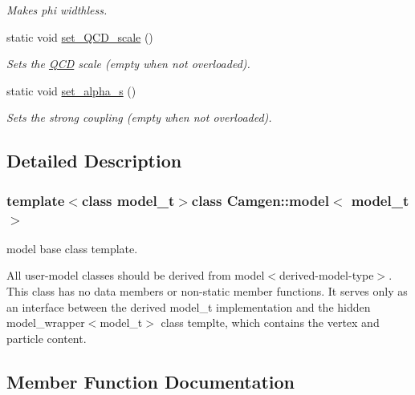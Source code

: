 \begin{DoxyCompactItemize}
\begin{DoxyCompactList}\small\item\em Makes phi widthless. \end{DoxyCompactList}\item 
\hypertarget{a00372_a19058cc8486cf061c09aca2e9a3b2a32}{}static void \hyperlink{a00372_a19058cc8486cf061c09aca2e9a3b2a32}{set\+\_\+\+Q\+C\+D\+\_\+scale} ()\label{a00372_a19058cc8486cf061c09aca2e9a3b2a32}

\begin{DoxyCompactList}\small\item\em Sets the \hyperlink{a00460}{Q\+C\+D} scale (empty when not overloaded). \end{DoxyCompactList}\item 
\hypertarget{a00372_ab7feace0bc1e763dfe540a84cd629b34}{}static void \hyperlink{a00372_ab7feace0bc1e763dfe540a84cd629b34}{set\+\_\+alpha\+\_\+s} ()\label{a00372_ab7feace0bc1e763dfe540a84cd629b34}

\begin{DoxyCompactList}\small\item\em Sets the strong coupling (empty when not overloaded). \end{DoxyCompactList}\end{DoxyCompactItemize}


\subsection{Detailed Description}
\subsubsection*{template$<$class model\+\_\+t$>$class Camgen\+::model$<$ model\+\_\+t $>$}

model base class template. 

All user-\/model classes should be derived from model$<$derived-\/model-\/type$>$. This class has no data members or non-\/static member functions. It serves only as an interface between the derived model\+\_\+t implementation and the hidden model\+\_\+wrapper$<$model\+\_\+t$>$ class templte, which contains the vertex and particle content. 

\subsection{Member Function Documentation}
\hypertarget{a00372_a37ba372a5b17bbb43840f2f195b7622d}{}
